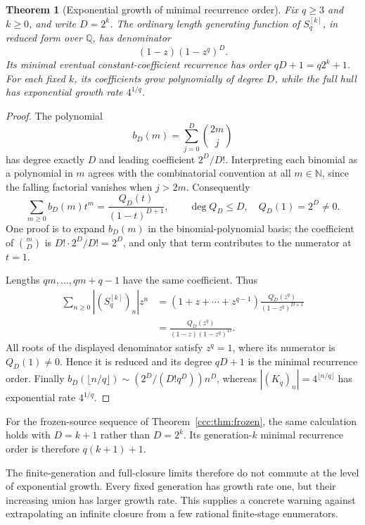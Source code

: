 \documentclass[11pt,letterpaper]{article}
\newtheorem{theorem}{Theorem}[section]
\theoremstyle{definition}
\theoremstyle{remark}
\newcommand{\N}{\mathbb N}
\newcommand{\gen}[2]{#1^{[#2]}}
\begin{document}
\begin{theorem}[Exponential growth of minimal recurrence order]
\label{ccc:thm:recurrence}
Fix $q\geq3$ and $k\geq0$, and write $D=2^k$. The ordinary length generating
function of $\gen{S_q}k$, in reduced form over $\mathbb Q$, has denominator
\begin{equation}
 (1-z)(1-z^q)^D.
 \label{ccc:eq:denominator}
\end{equation}
Its minimal eventual constant-coefficient recurrence has order $qD+1=q2^k+1$.
For each fixed $k$, its coefficients grow polynomially of degree $D$, while
the full hull has exponential growth rate $4^{1/q}$.
\end{theorem}
\begin{proof}
The polynomial
\[
 b_D(m)=\sum_{j=0}^{D}\binom{2m}{j}
\]
has degree exactly $D$ and leading coefficient $2^D/D!$. Interpreting each
binomial as a polynomial in $m$ agrees with the combinatorial convention at
all $m\in\N$, since the falling factorial vanishes when $j>2m$.
Consequently
\[
 \sum_{m\geq0}b_D(m)t^m=\frac{Q_D(t)}{(1-t)^{D+1}},
 \qquad \deg Q_D\leq D,\quad Q_D(1)=2^D\ne0.
\]
One proof is to expand $b_D(m)$ in the binomial-polynomial basis; the
coefficient of $\binom mD$ is $D!\cdot2^D/D!=2^D$, and only that term
contributes to the numerator at $t=1$.

Lengths $qm,\ldots,qm+q-1$ have the same coefficient. Thus
\begin{align*}
 \sum_{n\geq0}|(\gen{S_q}k)_n|z^n
 &=(1+z+\cdots+z^{q-1})\frac{Q_D(z^q)}{(1-z^q)^{D+1}}\\
 &=\frac{Q_D(z^q)}{(1-z)(1-z^q)^D}.
\end{align*}
All roots of the displayed denominator satisfy $z^q=1$, where its numerator
is $Q_D(1)\ne0$. Hence it is reduced and its degree $qD+1$ is the minimal
recurrence order. Finally
$b_D(\lfloor n/q\rfloor)\sim (2^D/(D!q^D))n^D$, whereas
$|(K_q)_n|=4^{\lfloor n/q\rfloor}$ has exponential rate $4^{1/q}$.
\end{proof}

For the frozen-source sequence of Theorem~\ref{ccc:thm:frozen}, the same
calculation holds with $D=k+1$ rather than $D=2^k$. Its generation-$k$
minimal recurrence order is therefore $q(k+1)+1$.

The finite-generation and full-closure limits therefore do not commute at
the level of exponential growth. Every fixed generation has growth rate one,
but their increasing union has larger growth rate. This supplies a concrete
warning against extrapolating an infinite closure from a few rational
finite-stage enumerators.
\end{document}
